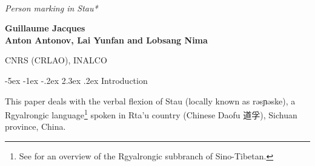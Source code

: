 \documentclass[oldfontcommands,twoside,12pt]{memoir}
\makeatletter
\newcommand{\ipa}[1]{{\phon #1}} %
\newcommand{\zh}[1]{{\cn #1}}
\newcommand{\titre}{\textit{Himalayan Linguistics, Vol 13(1).} \copyright{}   Himalayan Linguistics 2014\newline ISSN 1544-7502}
\renewcommand\section{\@startsection{section}{0}{\z@}%
                                   {-5ex \@plus -1ex \@minus -.2ex}%
                                   {2.3ex \@plus.2ex}%
                                   {\flushleft\large\bfseries}}
\makeatother
\begin{document}

 
\begin{flushleft}
\renewcommand{\thefootnote}{\fnsymbol{footnote}}
 
{\HUGE\textit{\\Person marking in Stau*}}

\vspace{24pt}
{\large\textbf{Guillaume Jacques\\ Anton Antonov, Lai Yunfan and Lobsang Nima}}

{\large CNRS (CRLAO), INALCO} 
\vspace{14pt}
\end{flushleft}

\renewcommand{\thefootnote}{\fnsymbol{footnote}}
\renewcommand{\thefootnote}{\arabic{footnote}}\setcounter{footnote}{0}
 
 

%
%
 
\section{Introduction}

This paper deals with the verbal flexion of Stau (locally known as \ipa{rəsɲəske}), a Rgyalrongic language\footnote{See \citet{jackson00sidaba} for an overview of the Rgyalrongic subbranch of Sino-Tibetan.} spoken in Rta'u country (Chinese Daofu \zh{道孚}), Sichuan province, China.
\end{document}
